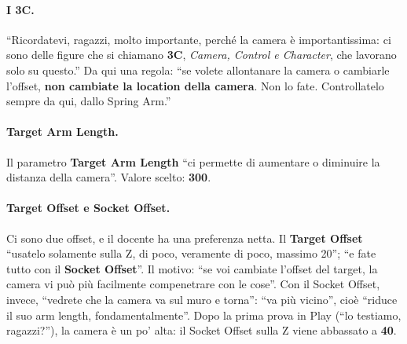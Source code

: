 \paragraph{I 3C.} ``Ricordatevi, ragazzi, molto importante, perché la camera è
importantissima: ci sono delle figure che si chiamano \textbf{3C}, \emph{Camera, Control
e Character}, che lavorano solo su questo.'' Da qui una regola: ``se volete allontanare la
camera o cambiarle l'offset, \textbf{non cambiate la location della camera}. Non lo fate.
Controllatelo sempre da qui, dallo Spring Arm.''

\paragraph{Target Arm Length.} Il parametro \textbf{Target Arm Length} ``ci permette di
aumentare o diminuire la distanza della camera''. Valore scelto: \textbf{300}.

\paragraph{Target Offset e Socket Offset.} Ci sono due offset, e il docente ha una
preferenza netta. Il \textbf{Target Offset} ``usatelo solamente sulla Z, di poco,
veramente di poco, massimo 20''; ``e fate tutto con il \textbf{Socket Offset}''. Il
motivo: ``se voi cambiate l'offset del target, la camera vi può più facilmente
compenetrare con le cose''. Con il Socket Offset, invece, ``vedrete che la camera va sul
muro e torna'': ``va più vicino'', cioè ``riduce il suo arm length, fondamentalmente''.
Dopo la prima prova in Play (``lo testiamo, ragazzi?''), la camera è un po' alta: il
Socket Offset sulla Z viene abbassato a \textbf{40}.

